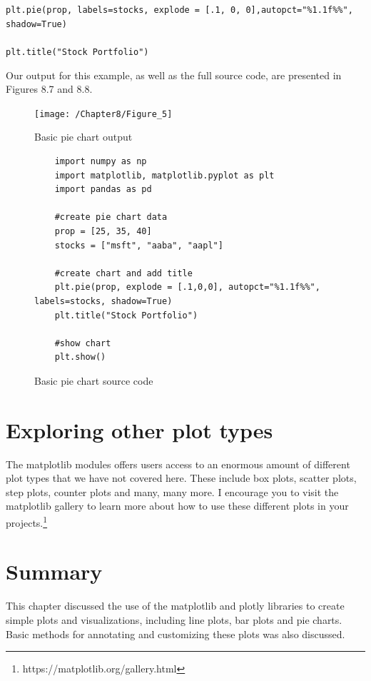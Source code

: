 \documentclass{book}
\begin{document}
\texttt{plt.pie(prop, labels=stocks, explode = [.1, 0, 0],autopct="\%1.1f\%\%", shadow=True)\\\\plt.title("Stock Portfolio")}

Our output for this example, as well as the full source code, are presented in Figures 8.7 and 8.8.

\begin{figure}[h]
	\caption{Basic pie chart output}
	\centering\texttt{[image: /Chapter8/Figure\_5]}
\end{figure}

\begin{figure}[h]
	\caption{Basic pie chart source code}
	\begin{lstlisting}
	import numpy as np
	import matplotlib, matplotlib.pyplot as plt
	import pandas as pd

	#create pie chart data
	prop = [25, 35, 40]
	stocks = ["msft", "aaba", "aapl"]

	#create chart and add title
	plt.pie(prop, explode = [.1,0,0], autopct="%1.1f%%", labels=stocks, shadow=True)
	plt.title("Stock Portfolio")

	#show chart
	plt.show()
	\end{lstlisting}
\end{figure}

\section{Exploring other plot types}

The matplotlib modules offers users access to an enormous amount of different plot types that we have not covered here. These include box plots, scatter plots, step plots, counter plots and many, many more. I encourage you to visit the matplotlib gallery to learn more about how to use these different plots in your projects.\footnote{https://matplotlib.org/gallery.html}

\section{Summary}

This chapter discussed the use of the matplotlib and plotly libraries to create simple plots and visualizations, including line plots, bar plots and pie charts. Basic methods for annotating and customizing these plots was also discussed. 
\end{document}
